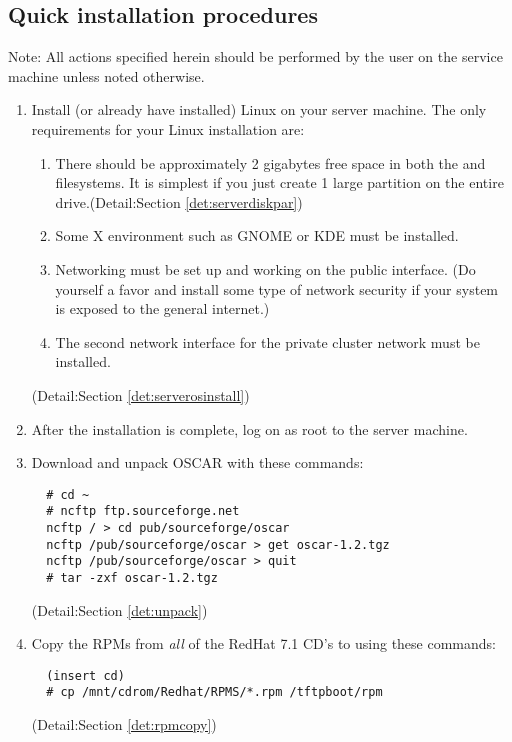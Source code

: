\subsection{Quick installation procedures}

Note: All actions specified herein should be performed by the
 user on the service machine unless noted otherwise.

\begin {enumerate}

\item Install (or already have installed) Linux on your server machine.
The only requirements for your Linux installation are:

        \begin{enumerate}
        \item There should be approximately 2 gigabytes free space in both
        the \file{/} and  filesystems. It is simplest if you
        just create 1 large partition on the entire drive.(Detail:Section
        \ref{det:serverdiskpar})
        \item Some X environment such as GNOME or KDE must be installed.
        \item Networking must be set up and working on the public interface.
        (Do yourself a favor and install some type of network security if
        your system is exposed to the general internet.)
        \item The second network interface for the private cluster network
        must be installed.
        \end{enumerate}
(Detail:Section \ref{det:serverosinstall})

\item After the installation is complete, log on as root to the server 
machine.

\item Download and unpack OSCAR with these commands:

\begin{verbatim}
  # cd ~
  # ncftp ftp.sourceforge.net
  ncftp / > cd pub/sourceforge/oscar
  ncftp /pub/sourceforge/oscar > get oscar-1.2.tgz
  ncftp /pub/sourceforge/oscar > quit
  # tar -zxf oscar-1.2.tgz
\end{verbatim}
(Detail:Section \ref{det:unpack})

\item Copy the RPMs from \emph{all} of the RedHat 7.1 CD's to 
using these commands:

\begin{verbatim}
  (insert cd)
  # cp /mnt/cdrom/Redhat/RPMS/*.rpm /tftpboot/rpm
\end{verbatim}
(Detail:Section \ref{det:rpmcopy})


\end{enumerate}
